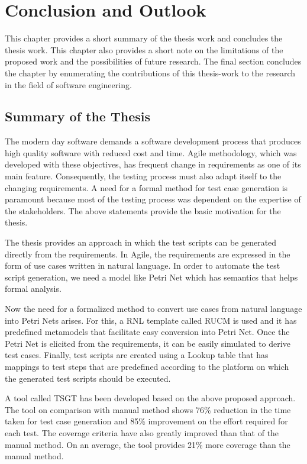 
\chapter{Conclusion and Outlook}\label{conclusion} 
This chapter provides a short summary of the thesis work and concludes the thesis work. This chapter also provides a short note on the limitations of the proposed work and the possibilities of future research. The final section concludes the chapter by enumerating the contributions of this thesis-work to the research in the field of software engineering.

\section{Summary of the Thesis}
The modern day software demands a software development process that produces high quality software with reduced cost and time.  Agile methodology, which was developed with these objectives, has frequent change in requirements as one of its main feature. Consequently, the testing process must also adapt itself to the changing requirements. A need for a formal method for test case generation is paramount because most of the testing process was dependent on the expertise of the stakeholders. The above statements provide the basic motivation for the thesis.

The thesis provides an approach in which the test scripts can be generated directly from the requirements. In Agile, the requirements are expressed in the form of use cases written in natural language. In order to automate the test script generation, we need a model like Petri Net which has semantics that helps formal analysis. 

Now the need for a formalized method to convert use cases from natural language into Petri Nets arises. For this, a RNL template called RUCM is used and it has predefined metamodels that facilitate easy conversion into Petri Net. Once the Petri Net is elicited from the requirements, it can be easily simulated to derive test cases. Finally, test scripts are created using a Lookup table that has mappings to test steps that are predefined according to the platform on which the generated test scripts should be executed.

A tool called TSGT has been developed based on the above proposed approach. The tool on comparison with manual method shows 76\% reduction in the time taken for test case generation and 85\% improvement on the effort required for each test. The coverage criteria have also greatly improved than that of the manual method. On an average, the tool provides 21\% more coverage than the manual method.

